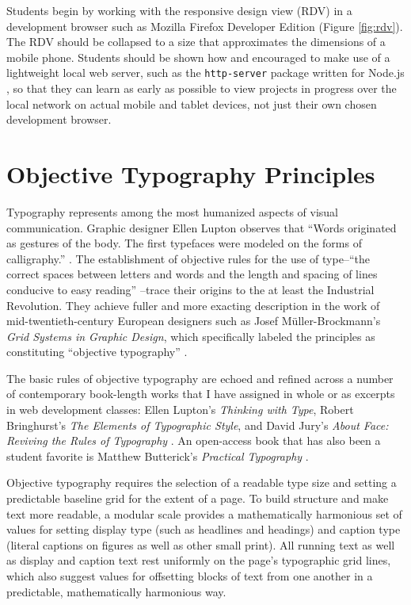 \documentclass[sigplan,screen]{acmart}
\begin{document}
Students begin by working with the responsive design view (RDV) in a development browser such as Mozilla Firefox Developer Edition (Figure \ref{fig:rdv}). The RDV should be collapsed to a size that approximates the dimensions of a mobile phone. Students should be shown how and encouraged to make use of a lightweight local web server, such as the \verb|http-server| package written for Node.js \cite{npm:http}, so that they can learn as early as possible to view projects in progress over the local network on actual mobile and tablet devices, not just their own chosen development browser.

\section{Objective Typography Principles}

Typography represents among the most humanized aspects of visual communication. Graphic designer Ellen Lupton observes that “Words originated as gestures of the body. The first typefaces were modeled on the forms of calligraphy.” \cite[p.~13]{el:type}. The establishment of objective rules for the use of type--“the correct spaces between letters and words and the length and spacing of lines conducive to easy reading” \cite[p.~19]{mb:grid}--trace their origins to the at least the Industrial Revolution. They achieve fuller and more exacting description in the work of mid-twentieth-century European designers such as Josef Müller-Brockmann’s {\itshape Grid Systems in Graphic Design}, which specifically labeled the principles as constituting “objective typography” \cite[p.~7]{mb:grid}.

The basic rules of objective typography are echoed and refined across a number of contemporary book-length works that I have assigned in whole or as excerpts in web development classes: Ellen Lupton’s {\itshape Thinking with Type}, Robert Bringhurst’s {\itshape The Elements of Typographic Style}, and David Jury’s {\itshape About Face: Reviving the Rules of Typography} \cite{el:type,rb:style,dj:face}. An open-access book that has also been a student favorite is Matthew Butterick’s {\itshape Practical Typography} \cite{mb:pt}.

Objective typography requires the selection of a readable type size and setting a predictable baseline grid for the extent of a page. To build structure and make text more readable, a modular scale provides a mathematically harmonious set of values for setting display type (such as headlines and headings) and caption type (literal captions on figures as well as other small print). All running text as well as display and caption text rest uniformly on the page’s typographic grid lines, which also suggest values for offsetting blocks of text from one another in a predictable, mathematically harmonious way.
\end{document}
